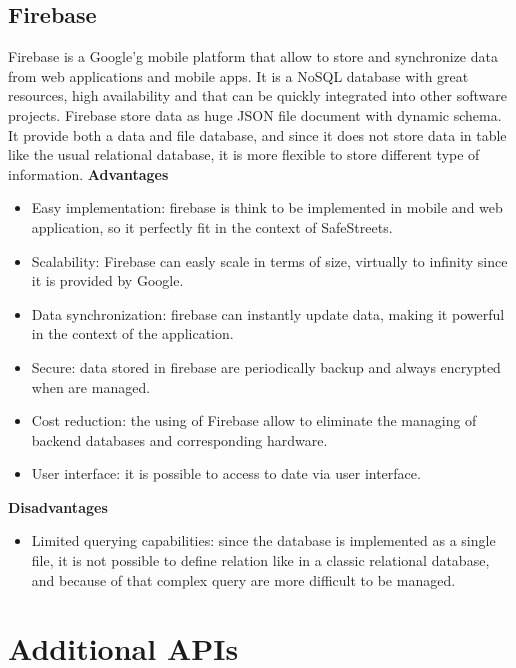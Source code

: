\documentclass[../ITD.tex]{subfiles}
\begin{document}
    \subsection{Firebase}\label{subsec:firebase}
    Firebase is a Google'g mobile platform that allow to store and synchronize data from web applications and mobile apps.
    It is a NoSQL database with great resources, high availability and that can be quickly integrated into other software projects.
    Firebase store data as huge JSON file document with dynamic schema.
    It provide both a data and file database, and since it does not store data in table like the usual relational database, it is more flexible to store different type of information.
    \newline
    \textbf{Advantages}
    \begin{itemize}
        \item Easy implementation: firebase is think to be implemented in mobile and web application, so it perfectly fit in the context of SafeStreets.
        \item Scalability: Firebase can easly scale in terms of size, virtually to infinity since it is provided by Google.
        \item Data synchronization: firebase can instantly update data, making it powerful in the context of the application.
        \item Secure: data stored in firebase are periodically backup and always encrypted when are managed.
        \item Cost reduction: the using of Firebase allow to eliminate the managing of backend databases and corresponding hardware.
        \item User interface: it is possible to access to date via user interface.
    \end{itemize}
    \newline
    \textbf{Disadvantages}
    \begin{itemize}
        \item Limited querying capabilities: since the database is implemented as a single file, it is not possible to define relation like in a classic relational database, and because of that complex query are more difficult to be managed.
    \end{itemize}
    \newline

    \section{Additional APIs}\label{sec:additional-apis}
\end{document}
